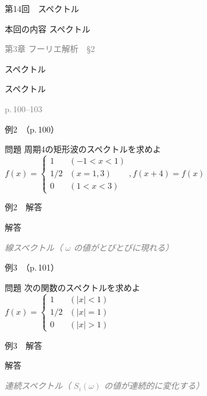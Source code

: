 \documentclass[aspectratio=43,professionalfonts,handout]{beamer}
\begin{document}
\begin{frame}{第14回　スペクトル}
  \begin{block}{本回の内容}
  スペクトル
  \end{block}
  \vfill\hfill{\scriptsize \textcolor{gray}{第3章 フーリエ解析　§2}}
\end{frame}

\begin{frame}{スペクトル}
  \begin{block}{}
  {\large スペクトル}
  \end{block}
  \vfill\hfill{\scriptsize \textcolor{gray}{p.\,100--103}}
\end{frame}

\begin{frame}{例2　（p.\,100）}
  \begin{exampleblock}{問題}
    周期4の矩形波のスペクトルを求めよ\\[2pt]
    $f(x) = \begin{cases} 1 & (-1 < x < 1) \\ 1/2 & (x = 1, 3) \\ 0 & (1 < x < 3) \end{cases},  f(x+4) = f(x)$\\[2pt]
  \end{exampleblock}
\end{frame}

\begin{frame}{例2　解答}
  \begin{exampleblock}{解答}
  \end{exampleblock}
  {\footnotesize \textcolor{gray}{\textit{線スペクトル（ $\omega$ の値がとびとびに現れる）}}}
\end{frame}

\begin{frame}{例3　（p.\,101）}
  \begin{exampleblock}{問題}
    次の関数のスペクトルを求めよ\\[2pt]
    $f(x) = \begin{cases} 1 & (|x| < 1) \\ 1/2 & (|x| = 1) \\ 0 & (|x| > 1) \end{cases}$\\[2pt]
  \end{exampleblock}
\end{frame}

\begin{frame}{例3　解答}
  \begin{exampleblock}{解答}
  \end{exampleblock}
  {\footnotesize \textcolor{gray}{\textit{連続スペクトル（ $S_i(\omega)$ の値が連続的に変化する）}}}
\end{frame}
\end{document}
